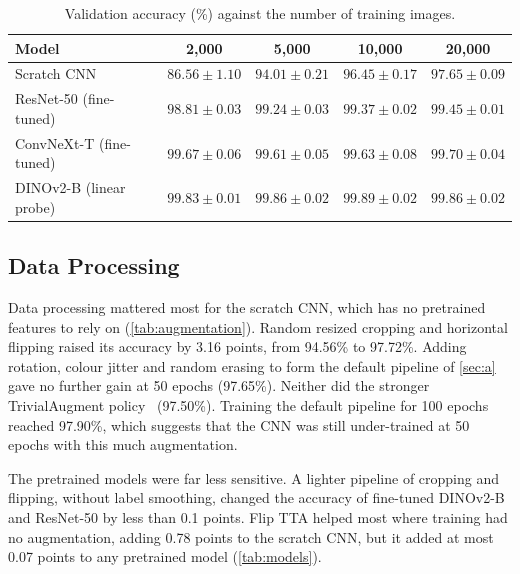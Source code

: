 \documentclass[11pt,a4paper]{article}
\newcommand{\pct}[1]{#1\%}
\begin{document}
\begin{table}[ht]
  \centering
  \small
  \caption{Validation accuracy (\%) against the number of training images.}
  \label{tab:datasize}
  \begin{tabular}{@{}lcccc@{}}
    \toprule
    Model & 2,000 & 5,000 & 10,000 & 20,000 \\
    \midrule
    Scratch CNN             & $86.56 \pm 1.10$ & $94.01 \pm 0.21$ & $96.45 \pm 0.17$ & $97.65 \pm 0.09$ \\
    ResNet-50 (fine-tuned)  & $98.81 \pm 0.03$ & $99.24 \pm 0.03$ & $99.37 \pm 0.02$ & $99.45 \pm 0.01$ \\
    ConvNeXt-T (fine-tuned) & $99.67 \pm 0.06$ & $99.61 \pm 0.05$ & $99.63 \pm 0.08$ & $99.70 \pm 0.04$ \\
    DINOv2-B (linear probe) & $99.83 \pm 0.01$ & $99.86 \pm 0.02$ & $99.89 \pm 0.02$ & $99.86 \pm 0.02$ \\
    \bottomrule
  \end{tabular}
\end{table}

\subsection*{Data Processing}

Data processing mattered most for the scratch CNN, which has no pretrained features to rely on (\cref{tab:augmentation}). Random resized cropping and horizontal flipping raised its accuracy by 3.16 points, from \pct{94.56} to \pct{97.72}. Adding rotation, colour jitter and random erasing to form the default pipeline of \cref{sec:a} gave no further gain at 50 epochs (\pct{97.65}). Neither did the stronger TrivialAugment policy~\cite{muller2021trivialaugment} (\pct{97.50}). Training the default pipeline for 100 epochs reached \pct{97.90}, which suggests that the CNN was still under-trained at 50 epochs with this much augmentation.

The pretrained models were far less sensitive. A lighter pipeline of cropping and flipping, without label smoothing, changed the accuracy of fine-tuned DINOv2-B and ResNet-50 by less than 0.1 points. Flip TTA helped most where training had no augmentation, adding 0.78 points to the scratch CNN, but it added at most 0.07 points to any pretrained model (\cref{tab:models}).
\end{document}
